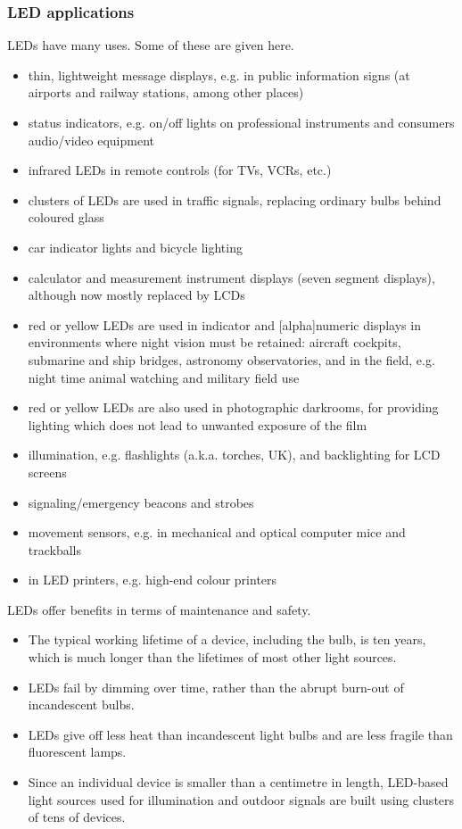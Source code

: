 \subsubsection{LED applications}
LEDs have many uses.  Some of these are given here.
\begin{itemize}
\item thin, lightweight message displays, e.g. in public information signs (at airports and railway stations, among other places)
\item status indicators, e.g. on/off lights on professional instruments and consumers audio/video equipment
\item infrared LEDs in remote controls (for TVs, VCRs, etc.)
\item clusters of LEDs are used in traffic signals, replacing ordinary bulbs behind coloured glass
\item car indicator lights and bicycle lighting
\item calculator and measurement instrument displays (seven segment displays), although now mostly replaced by LCDs
\item red or yellow LEDs are used in indicator and [alpha]numeric displays in environments where night vision must be retained: aircraft cockpits, submarine and ship bridges, astronomy observatories, and in the field, e.g. night time animal watching and military field use
\item red or yellow LEDs are also used in photographic darkrooms, for providing lighting which does not lead to unwanted exposure of the film
\item illumination, e.g. flashlights (a.k.a. torches, UK), and backlighting for LCD screens
\item signaling/emergency beacons and strobes
\item movement sensors, e.g. in mechanical and optical computer mice and trackballs
\item in LED printers, e.g. high-end colour printers
\end{itemize}

LEDs offer benefits in terms of maintenance and safety.

\begin{itemize}
\item The typical working lifetime of a device, including the bulb, is ten years, which is much longer than the lifetimes of most other light sources.
\item LEDs fail by dimming over time, rather than the abrupt burn-out of incandescent bulbs.
\item LEDs give off less heat than incandescent light bulbs and are less fragile than fluorescent lamps.
\item Since an individual device is smaller than a centimetre in length, LED-based light sources used for illumination and outdoor signals are built using clusters of tens of devices.
\end{itemize}

